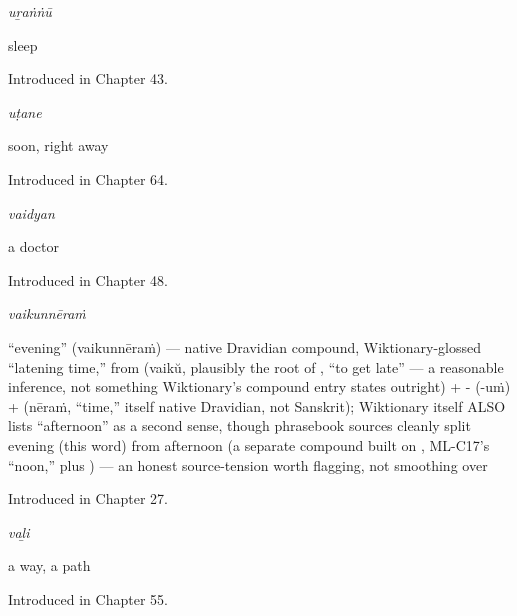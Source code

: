 \noindent\begin{minipage}[t]{\linewidth}
\raggedright
\textbf{}\enspace\emph{uṟaṅṅū}\par
\small sleep\par
\footnotesize Introduced in Chapter 43.
\end{minipage}\par\medskip

\noindent\begin{minipage}[t]{\linewidth}
\raggedright
\textbf{}\enspace\emph{uṭane}\par
\small soon, right away\par
\footnotesize Introduced in Chapter 64.
\end{minipage}\par\medskip

\noindent\begin{minipage}[t]{\linewidth}
\raggedright
\textbf{}\enspace\emph{vaidyan}\par
\small a doctor\par
\footnotesize Introduced in Chapter 48.
\end{minipage}\par\medskip

\noindent\begin{minipage}[t]{\linewidth}
\raggedright
\textbf{}\enspace\emph{vaikunnēraṁ}\par
\small \textquotedblleft{}evening\textquotedblright{} (vaikunnēraṁ) — native Dravidian compound, Wiktionary-glossed \textquotedblleft{}latening time,\textquotedblright{} from  (vaikŭ, plausibly the root of , \textquotedblleft{}to get late\textquotedblright{} — a reasonable inference, not something Wiktionary's compound entry states outright) + - (-uṁ) +  (nēraṁ, \textquotedblleft{}time,\textquotedblright{} itself native Dravidian, not Sanskrit); Wiktionary itself ALSO lists \textquotedblleft{}afternoon\textquotedblright{} as a second sense, though phrasebook sources cleanly split evening (this word) from afternoon (a separate compound built on , ML-C17's \textquotedblleft{}noon,\textquotedblright{} plus ) — an honest source-tension worth flagging, not smoothing over\par
\footnotesize Introduced in Chapter 27.
\end{minipage}\par\medskip

\noindent\begin{minipage}[t]{\linewidth}
\raggedright
\textbf{}\enspace\emph{vaḻi}\par
\small a way, a path\par
\footnotesize Introduced in Chapter 55.
\end{minipage}\par\medskip

